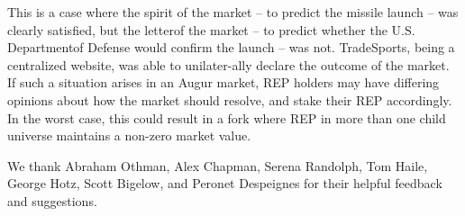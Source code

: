\documentclass[12pt,floatfix,reprint,nofootinbib,amsmath,amssymb,epsfig,pre,floats,letterpaper,groupedaffiliation]{revtex4-1}
\theoremstyle{definition}
\theoremstyle{definition}
\begin{document}
This is a case where the spirit of the market -- to predict the missile launch -- was clearly satisfied, but the letter\linebreak of the market -- to predict whether the U.S. Department\linebreak of Defense would confirm the launch -- was not. TradeSports, being a centralized website, was able to unilater-\linebreak ally declare the outcome of the market. If such a situation arises in an Augur market, REP holders may have differing opinions about how the market should resolve, and stake their REP accordingly. In the worst case, this could result in a fork where REP in more than one child universe maintains a non-zero market value.

\begin{acknowledgments}\label{section:acknowledgements}
We thank Abraham Othman, Alex Chapman, Serena Randolph, Tom Haile, George Hotz, Scott Bigelow, and Peronet Despeignes for their helpful feedback and sug\-gestions.
\end{acknowledgments}



\end{document}
